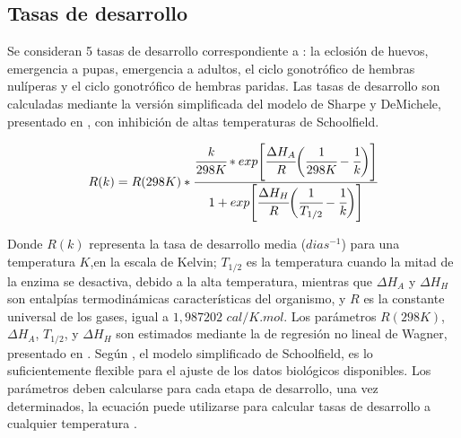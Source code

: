 \subsection{Tasas de desarrollo}
Se consideran 5 tasas de desarrollo correspondiente a : la eclosión de huevos,
emergencia a pupas, emergencia a adultos, el ciclo gonotrófico de hembras nulíperas y el ciclo gonotrófico de hembras paridas. Las tasas de desarrollo son calculadas mediante la versión simplificada del modelo de Sharpe y DeMichele, presentado en \cite{sharpe1977reaction},
con inhibición de altas temperaturas de Schoolfield.

\begin{equation} \label{eq:schoolfield}
   R(k)  = R(298K) *\cfrac{ \cfrac{k}{298K} *
    exp \Bigg[
            \cfrac{\Delta H_{A}}{R} \bigg(\cfrac{1}{298K} - \cfrac{1}{k}\bigg)
        \Bigg]}
    {1 + exp\Bigg[\cfrac{\Delta H_{H}}{R} \bigg(\cfrac{1}{T_{1/2}}- \cfrac{1}{k}\bigg)\Bigg] }
\end{equation}

Donde $R(k)$ representa la tasa de desarrollo media ($dias^{-1}$) para una temperatura $K$,en la
escala de Kelvin; $T_{1/2}$ es la temperatura cuando la mitad de la enzima se desactiva, debido a
la alta temperatura, mientras que $\Delta H_{A}$ y $\Delta H_{H}$  son entalpías termodinámicas características del organismo, y $R$ es la constante universal de los gases, igual a
$1,987202$ $cal/K.mol$. Los parámetros $R(298K)$, $\Delta H_{A}$, $T_{1/2}$, y $\Delta H_{H}$ son estimados mediante la de regresión no lineal de Wagner, presentado en \cite{wagner1984modeling}.
Según \cite{otero2006stochastic}, el modelo simplificado de Schoolfield, es lo suficientemente
flexible para el ajuste de los datos biológicos disponibles. Los parámetros deben calcularse para
cada etapa de desarrollo, una vez determinados, la ecuación puede utilizarse para calcular tasas
de desarrollo a cualquier temperatura \cite{rueda1990temperature}.

